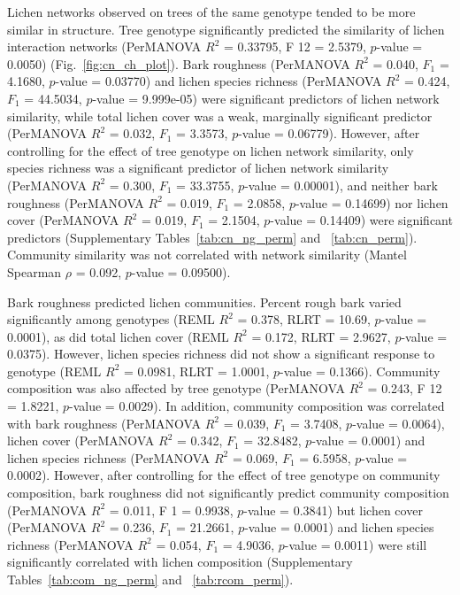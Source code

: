 \documentclass[9pt,twocolumn,twoside,lineno]{pnas-new}
\begin{document}
{Lichen networks observed on trees of the same genotype tended to be
more similar in structure. Tree genotype significantly predicted the
similarity of lichen interaction networks (PerMANOVA $R^2$ = 0.33795,
F 12 = 2.5379, $p$-value = 0.0050) (Fig.~\ref{fig:cn_ch_plot}). Bark
roughness (PerMANOVA $R^2$ = 0.040, $F_1$ = 4.1680, $p$-value =
0.03770) and lichen species richness (PerMANOVA $R^2$ = 0.424, $F_1$ =
44.5034, $p$-value = 9.999e-05) were significant predictors of lichen
network similarity, while total lichen cover was a weak, marginally
significant predictor (PerMANOVA $R^2$ = 0.032, $F_1$ = 3.3573,
$p$-value = 0.06779). However, after controlling for the effect of
tree genotype on lichen network similarity, only species richness was
a significant predictor of lichen network similarity (PerMANOVA $R^2$
= 0.300, $F_1$ = 33.3755, $p$-value = 0.00001), and neither bark
roughness (PerMANOVA $R^2$ = 0.019, $F_1$ = 2.0858, $p$-value =
0.14699) nor lichen cover (PerMANOVA $R^2$ = 0.019, $F_1$ = 2.1504,
$p$-value = 0.14409) were significant predictors (Supplementary
Tables~\ref{tab:cn_ng_perm} and ~\ref{tab:cn_perm}). Community
similarity was not correlated with network similarity (Mantel Spearman
$\rho$ = 0.092, $p$-value = 0.09500).


Bark roughness predicted lichen communities. Percent rough bark varied
significantly among genotypes (REML $R^2$ = 0.378, RLRT = 10.69,
$p$-value = 0.0001), as did total lichen cover (REML $R^2$ = 0.172,
RLRT = 2.9627, $p$-value = 0.0375). However, lichen species richness
did not show a significant response to genotype (REML $R^2$ = 0.0981,
RLRT = 1.0001, $p$-value = 0.1366). Community composition was also
affected by tree genotype (PerMANOVA $R^2$ = 0.243, F 12 = 1.8221,
$p$-value = 0.0029). In addition, community composition was correlated
with bark roughness (PerMANOVA $R^2$ = 0.039, $F_1$ = 3.7408,
$p$-value = 0.0064), lichen cover (PerMANOVA $R^2$ = 0.342, $F_1$ =
32.8482, $p$-value = 0.0001) and lichen species richness (PerMANOVA
$R^2$ = 0.069, $F_1$ = 6.5958, $p$-value = 0.0002). However, after
controlling for the effect of tree genotype on community composition,
bark roughness did not significantly predict community composition
(PerMANOVA $R^2$ = 0.011, F 1 = 0.9938, $p$-value = 0.3841) but lichen
cover (PerMANOVA $R^2$ = 0.236, $F_1$ = 21.2661, $p$-value = 0.0001)
and lichen species richness (PerMANOVA $R^2$ = 0.054, $F_1$ = 4.9036,
$p$-value = 0.0011) were still significantly correlated with lichen
composition (Supplementary Tables~\ref{tab:com_ng_perm} and
~\ref{tab:rcom_perm}).



}
\end{document}
